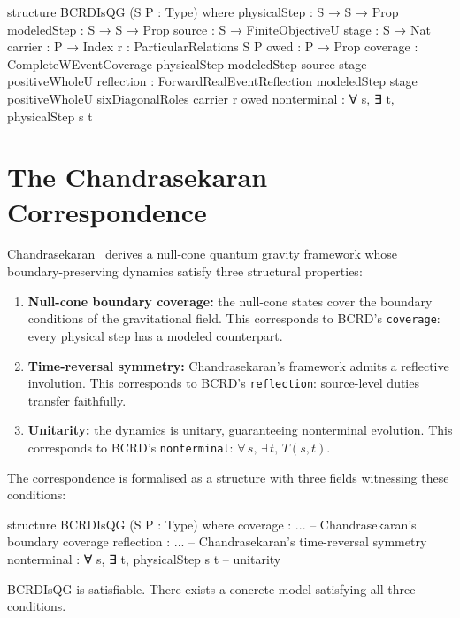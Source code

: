 \begin{leancode}
structure BCRDIsQG (S P : Type) where
  physicalStep : S → S → Prop
  modeledStep : S → S → Prop
  source : S → FiniteObjectiveU
  stage : S → Nat
  carrier : P → Index
  r : ParticularRelations S P
  owed : P → Prop
  coverage : CompleteWEventCoverage physicalStep modeledStep
    source stage positiveWholeU
  reflection : ForwardRealEventReflection modeledStep stage
    positiveWholeU sixDiagonalRoles carrier r owed
  nonterminal : ∀ s, ∃ t, physicalStep s t
\end{leancode}

\section{The Chandrasekaran Correspondence}\label{sec:correspondence}

Chandrasekaran~\cite{chandrasekaran2026} derives a null-cone quantum gravity framework whose boundary-preserving dynamics satisfy three structural properties:

\begin{enumerate}
\item \textbf{Null-cone boundary coverage:} the null-cone states cover the boundary conditions of the gravitational field. This corresponds to BCRD's \texttt{coverage}: every physical step has a modeled counterpart.
\item \textbf{Time-reversal symmetry:} Chandrasekaran's framework admits a reflective involution. This corresponds to BCRD's \texttt{reflection}: source-level duties transfer faithfully.
\item \textbf{Unitarity:} the dynamics is unitary, guaranteeing nonterminal evolution. This corresponds to BCRD's \texttt{nonterminal}: $\forall\, s,\, \exists\, t,\, T(s,t)$.
\end{enumerate}

The correspondence is formalised as a structure with three fields witnessing these conditions:

\begin{leancode}
structure BCRDIsQG (S P : Type) where
  coverage   : ...  -- Chandrasekaran's boundary coverage
  reflection : ...  -- Chandrasekaran's time-reversal symmetry
  nonterminal : ∀ s, ∃ t, physicalStep s t  -- unitarity
\end{leancode}

\begin{theorem}[QG is satisfiable]\label{thm:satisfiable}
BCRDIsQG is satisfiable. There exists a concrete model satisfying all three conditions.
\end{theorem}

